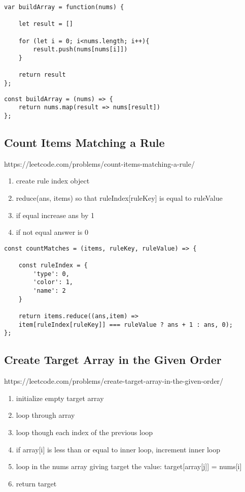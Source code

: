 \documentclass[10pt]{article}
\begin{document}
\begin{lstlisting}[title=Solution with for loop, captionpos=t]
var buildArray = function(nums) {

    let result = []
    
    for (let i = 0; i<nums.length; i++){
        result.push(nums[nums[i]])
    }
    
    return result
};
\end{lstlisting}
	
\begin{lstlisting}[title=Solution with map(), captionpos=t]
const buildArray = (nums) => {
    return nums.map(result => nums[result])
};
\end{lstlisting}
\medskip %

\pagebreak
\medskip %
\subsection{Count Items Matching a Rule}
https://leetcode.com/problems/count-items-matching-a-rule/

\begin{enumerate}
	\item create rule index object
	\item reduce(ans, items) so that ruleIndex[ruleKey] is equal to ruleValue
	\item if equal increase ans by 1
	\item if not equal answer is 0 
\end{enumerate}

\begin{lstlisting}[title=Solution countMatches, captionpos=t]
const countMatches = (items, ruleKey, ruleValue) => {

    const ruleIndex = {
        'type': 0,
        'color': 1,
        'name': 2
    }
    
    return items.reduce((ans,item) => 
    item[ruleIndex[ruleKey]] === ruleValue ? ans + 1 : ans, 0);
};
\end{lstlisting}
\medskip %

\pagebreak
\medskip %
\subsection{Create Target Array in the Given Order}
https://leetcode.com/problems/create-target-array-in-the-given-order/

\begin{enumerate}
	\item initialize empty target array
	\item loop through array 
	\item loop though each index of the previous loop
	\item if array[i] is less than or equal to inner loop, increment inner loop
	\item loop in the nums array giving target the value: target[array[j]] = nums[i]
	\item return target 
\end{enumerate}
\end{document}
